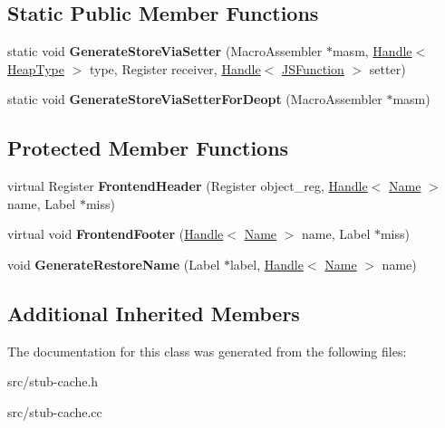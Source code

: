 \subsection*{Static Public Member Functions}
\begin{DoxyCompactItemize}
\item 
\hypertarget{classv8_1_1internal_1_1_named_store_handler_compiler_ab25bb99fab65c5741940eed33f766fd8}{}static void {\bfseries Generate\+Store\+Via\+Setter} (Macro\+Assembler $\ast$masm, \hyperlink{classv8_1_1internal_1_1_handle}{Handle}$<$ \hyperlink{classv8_1_1internal_1_1_type_impl}{Heap\+Type} $>$ type, Register receiver, \hyperlink{classv8_1_1internal_1_1_handle}{Handle}$<$ \hyperlink{classv8_1_1internal_1_1_j_s_function}{J\+S\+Function} $>$ setter)\label{classv8_1_1internal_1_1_named_store_handler_compiler_ab25bb99fab65c5741940eed33f766fd8}

\item 
\hypertarget{classv8_1_1internal_1_1_named_store_handler_compiler_a072c53801d39146f40ab1a571d3ec287}{}static void {\bfseries Generate\+Store\+Via\+Setter\+For\+Deopt} (Macro\+Assembler $\ast$masm)\label{classv8_1_1internal_1_1_named_store_handler_compiler_a072c53801d39146f40ab1a571d3ec287}

\end{DoxyCompactItemize}
\subsection*{Protected Member Functions}
\begin{DoxyCompactItemize}
\item 
\hypertarget{classv8_1_1internal_1_1_named_store_handler_compiler_ada4a1777f1fc35f111913df5f7ba8832}{}virtual Register {\bfseries Frontend\+Header} (Register object\+\_\+reg, \hyperlink{classv8_1_1internal_1_1_handle}{Handle}$<$ \hyperlink{classv8_1_1internal_1_1_name}{Name} $>$ name, Label $\ast$miss)\label{classv8_1_1internal_1_1_named_store_handler_compiler_ada4a1777f1fc35f111913df5f7ba8832}

\item 
\hypertarget{classv8_1_1internal_1_1_named_store_handler_compiler_a155c9ac14795a0c3265b1221b7acee00}{}virtual void {\bfseries Frontend\+Footer} (\hyperlink{classv8_1_1internal_1_1_handle}{Handle}$<$ \hyperlink{classv8_1_1internal_1_1_name}{Name} $>$ name, Label $\ast$miss)\label{classv8_1_1internal_1_1_named_store_handler_compiler_a155c9ac14795a0c3265b1221b7acee00}

\item 
\hypertarget{classv8_1_1internal_1_1_named_store_handler_compiler_a5da9c7561fe36ebd6063904dec84510f}{}void {\bfseries Generate\+Restore\+Name} (Label $\ast$label, \hyperlink{classv8_1_1internal_1_1_handle}{Handle}$<$ \hyperlink{classv8_1_1internal_1_1_name}{Name} $>$ name)\label{classv8_1_1internal_1_1_named_store_handler_compiler_a5da9c7561fe36ebd6063904dec84510f}

\end{DoxyCompactItemize}
\subsection*{Additional Inherited Members}


The documentation for this class was generated from the following files\+:\begin{DoxyCompactItemize}
\item 
src/stub-\/cache.\+h\item 
src/stub-\/cache.\+cc\end{DoxyCompactItemize}
